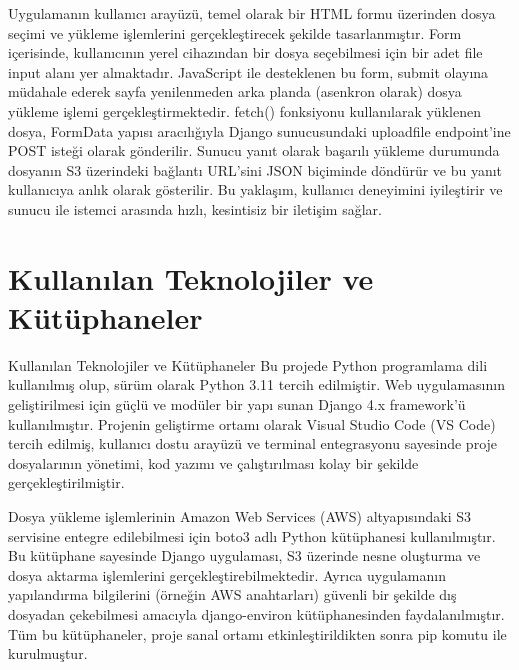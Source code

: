 Uygulamanın kullanıcı arayüzü, temel olarak bir HTML formu üzerinden dosya seçimi ve yükleme işlemlerini gerçekleştirecek şekilde tasarlanmıştır. Form içerisinde, kullanıcının yerel cihazından bir dosya seçebilmesi için bir adet file input alanı yer almaktadır. JavaScript ile desteklenen bu form, submit olayına müdahale ederek sayfa yenilenmeden arka planda (asenkron olarak) dosya yükleme işlemi gerçekleştirmektedir. fetch() fonksiyonu kullanılarak yüklenen dosya, FormData yapısı aracılığıyla Django sunucusundaki uploadfile endpoint'ine POST isteği olarak gönderilir. Sunucu yanıt olarak başarılı yükleme durumunda dosyanın S3 üzerindeki bağlantı URL’sini JSON biçiminde döndürür ve bu yanıt kullanıcıya anlık olarak gösterilir. Bu yaklaşım, kullanıcı deneyimini iyileştirir ve sunucu ile istemci arasında hızlı, kesintisiz bir iletişim sağlar.

\section{Kullanılan Teknolojiler ve Kütüphaneler}
Kullanılan Teknolojiler ve Kütüphaneler
Bu projede Python programlama dili kullanılmış olup, sürüm olarak Python 3.11 tercih edilmiştir. Web uygulamasının geliştirilmesi için güçlü ve modüler bir yapı sunan Django 4.x framework’ü kullanılmıştır. Projenin geliştirme ortamı olarak Visual Studio Code (VS Code) tercih edilmiş, kullanıcı dostu arayüzü ve terminal entegrasyonu sayesinde proje dosyalarının yönetimi, kod yazımı ve çalıştırılması kolay bir şekilde gerçekleştirilmiştir.

Dosya yükleme işlemlerinin Amazon Web Services (AWS) altyapısındaki S3 servisine entegre edilebilmesi için boto3 adlı Python kütüphanesi kullanılmıştır. Bu kütüphane sayesinde Django uygulaması, S3 üzerinde nesne oluşturma ve dosya aktarma işlemlerini gerçekleştirebilmektedir. Ayrıca uygulamanın yapılandırma bilgilerini (örneğin AWS anahtarları) güvenli bir şekilde dış dosyadan çekebilmesi amacıyla django-environ kütüphanesinden faydalanılmıştır. Tüm bu kütüphaneler, proje sanal ortamı etkinleştirildikten sonra pip komutu ile kurulmuştur.